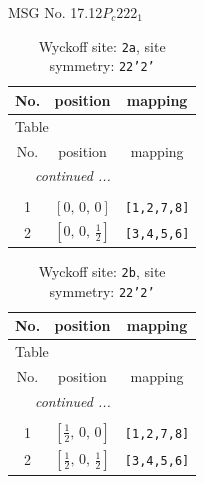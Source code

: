 \documentclass[fleqn,8pt]{jsarticle}
\begin{document}
\setcounter{MaxMatrixCols}{32}

\renewcommand{\tablename}{Table~}
\renewcommand{\figurename}{Figure~}
\begin{center}
\LARGE
MSG No. 17.12\quad$P_{c}222_{1}$
\end{center}
\renewcommand{\arraystretch}{1.2}
\begin{longtable}{ccc}
\caption{Wyckoff site: {\tt 2a}, site symmetry: {\tt 22'2'}}
 \\
 \hline \hline
No. & position & mapping \\ \hline \endfirsthead

\multicolumn{2}{l}{\tablename\ \thetable{}} \\
 \hline \hline
No. & position & mapping \\ \hline \endhead

 \hline \hline
\multicolumn{2}{r}{\footnotesize\it continued ...} \\ \endfoot

 \hline \hline
\multicolumn{2}{r}{} \\ \endlastfoot

1 & $\left[ 0,\, 0,\, 0 \right]$ & {\tt [1,2,7,8]} \\ \hline
2 & $\left[ 0,\, 0,\, \frac{1}{2} \right]$ & {\tt [3,4,5,6]} \\
\end{longtable}
\renewcommand{\arraystretch}{1.2}
\begin{longtable}{ccc}
\caption{Wyckoff site: {\tt 2b}, site symmetry: {\tt 22'2'}}
 \\
 \hline \hline
No. & position & mapping \\ \hline \endfirsthead

\multicolumn{2}{l}{\tablename\ \thetable{}} \\
 \hline \hline
No. & position & mapping \\ \hline \endhead

 \hline \hline
\multicolumn{2}{r}{\footnotesize\it continued ...} \\ \endfoot

 \hline \hline
\multicolumn{2}{r}{} \\ \endlastfoot

1 & $\left[ \frac{1}{2},\, 0,\, 0 \right]$ & {\tt [1,2,7,8]} \\ \hline
2 & $\left[ \frac{1}{2},\, 0,\, \frac{1}{2} \right]$ & {\tt [3,4,5,6]} \\
\end{longtable}
\renewcommand{\arraystretch}{1.2}
\end{document}
